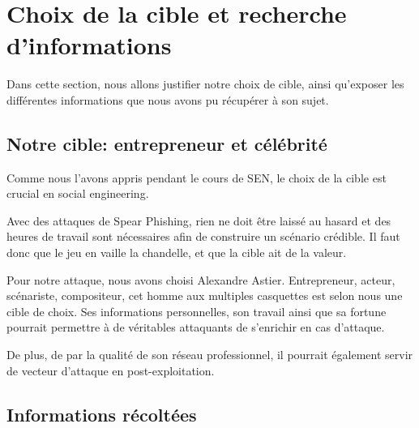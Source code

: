 \section{Choix de la cible et recherche d'informations}

Dans cette section, nous allons justifier notre choix de cible, ainsi qu'exposer les différentes informations
que nous avons pu récupérer à son sujet. 

\subsection{Notre cible: entrepreneur et célébrité}

Comme nous l'avons appris pendant le cours de SEN, le choix de la cible est crucial en social engineering.

Avec des attaques de Spear Phishing, rien ne doit être laissé au hasard et des heures de travail sont nécessaires afin de construire un scénario
crédible. Il faut donc que le jeu en vaille la chandelle, et que la cible ait de la valeur. 

Pour notre attaque, nous avons choisi Alexandre Astier. Entrepreneur, acteur, scénariste, compositeur, cet homme aux multiples casquettes est selon nous une cible de choix. 
Ses informations personnelles, son travail ainsi que sa fortune pourrait permettre à de véritables attaquants de s'enrichir en cas d'attaque.

De plus, de par la qualité de son réseau professionnel, il pourrait également servir de vecteur d'attaque en post-exploitation.

\subsection{Informations récoltées}

